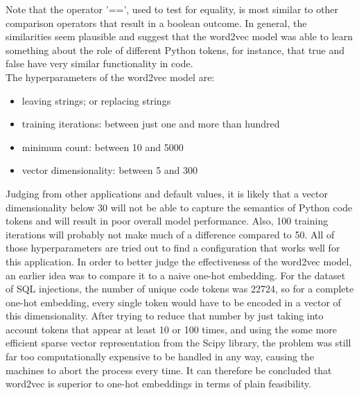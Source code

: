 \documentclass[
a4paper,
pagesize,
pdftex,
12pt,
twoside, %
BCOR=5mm, %
ngerman,
fleqn,
final,
]{scrartcl}
\begin{document}
	Note that the operator '==', used to test for equality, is most similar to other comparison operators that result in a boolean outcome. In general, the similarities seem plausible and suggest that the word2vec model was able to learn something about the role of different Python tokens, for instance, that true and false have very similar functionality in code.\\ 
	The hyperparameters of the word2vec model are:
	\begin{itemize}[noitemsep]
		\item leaving strings; or replacing strings
		\item training iterations: between just one and more than hundred
		\item minimum count: between 10 and 5000
		\item vector dimensionality: between 5 and 300
	\end{itemize}
	
	Judging from other applications and default values, it is likely that a vector dimensionality below 30 will not be able to capture the semantics of Python code tokens and will result in poor overall model performance. Also, 100 training iterations will probably not make much of a difference compared to 50. All of those hyperparameters are tried out to find a configuration that works well for this application.
	In order to better judge the effectiveness of the word2vec model, an earlier idea was to compare it to a naive one-hot embedding. For the dataset of SQL injections, the number of unique code tokens was 22724, so for a complete one-hot embedding, every single token would have to be encoded in a vector of this dimensionality. After trying to reduce that number by just taking into account tokens that appear at least 10 or 100 times, and using the some more efficient sparse vector representation from the Scipy library, the problem was still far too computationally expensive to be handled in any way, causing the machines to abort the process every time. It can therefore be concluded that word2vec is superior to one-hot embeddings in terms of plain feasibility.
	
	
	
\end{document}
